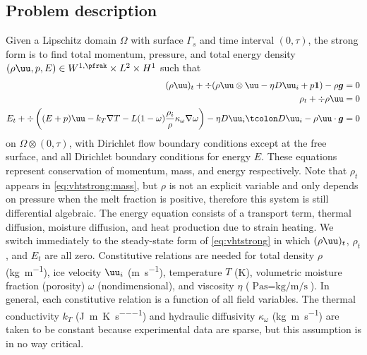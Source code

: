 \subsection{Problem description}\label{ssec:vhtproblem}
Given a Lipschitz domain $\Omega$ with surface $\Gamma_s$ and time interval $(0,\tau)$, the strong form is to find total momentum, pressure, and total energy density $(\rho\uu,p,E) \in W^{1,\pfrak} \times L^2 \times H^1$ such that
\begin{subequations}\label{eq:vhtstrong}
  \begin{align}
    (\rho\uu)_t + \div (\rho\uu\otimes\uu - \eta D\uu_i + p\bm 1) - \rho \bm g &= 0 \label{eq:vhtstrong:momentum} \\
    \rho_t + \div \rho\uu &= 0 \label{eq:vhtstrong:mass} \\
    E_t + \div \left((E+p)\uu - k_T\nabla T - L (1-\omega)\frac{\rho_i}{\rho}\kappa_\omega\nabla\omega \right) - \eta D\uu_i\tcolon D\uu_i - \rho\uu\cdot\bm g &= 0 \label{eq:vhtstrong:energy}
  \end{align}
\end{subequations}
on $\Omega\otimes (0,\tau)$, with Dirichlet flow boundary conditions except at the free surface, and all Dirichlet boundary conditions for energy $E$.
These equations represent conservation of momentum, mass, and energy respectively.
Note that $\rho_t$ appears in \eqref{eq:vhtstrong:mass}, but $\rho$ is not an explicit variable and only depends on pressure when the melt fraction is positive, therefore this system is still differential algebraic.
The energy equation consists of a transport term, thermal diffusion, moisture diffusion, and heat production due to strain heating.
We switch immediately to the steady-state form of \eqref{eq:vhtstrong} in which $(\rho\uu)_t$, $\rho_t$, and $E_t$ are all zero.
Constitutive relations are needed for total density $\rho$ (\si{\kilogram\per\metre}), ice velocity $\uu_i$ (\si{\metre\per\second}), temperature $T$ (\si{\kelvin}), volumetric moisture fraction (porosity) $\omega$ (nondimensional), and viscosity $\eta$ ($\si{\pascal\second} = \si{\kilogram\per\metre\per\second}$).
In general, each constitutive relation is a function of all field variables.
The thermal conductivity $k_T$ (\si{\joule\per\metre\per\kelvin\per\second}) and hydraulic diffusivity $\kappa_\omega$ (\si{\kilogram\metre\per\second}) are taken to be constant because experimental data are sparse, but this assumption is in no way critical.

